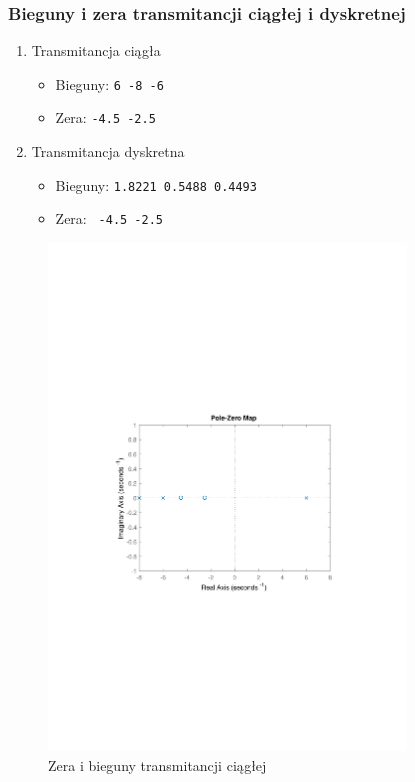 \documentclass{article}
\begin{document}
\subsubsection[Bieguny i zera]{Bieguny i zera transmitancji ciągłej i dyskretnej}
\begin{enumerate}
\item Transmitancja ciągła
\begin{itemize}
\item Bieguny: \verb+6 -8 -6+
\item Zera: \verb+-4.5 -2.5+
\end{itemize}

\item Transmitancja dyskretna
\begin{itemize}
\item Bieguny: \verb+1.8221 0.5488 0.4493+
\item Zera: \verb+ -4.5 -2.5+
\end{itemize}
\end{enumerate}
\begin{figure}[t]
\centering
\includegraphics[clip, trim=3cm 9cm 3cm 9.5cm, width=9.5cm]{../rys/rys1.pdf}
\caption{Zera i bieguny transmitancji ciągłej}
\label{fig:rys 1}
\end{figure}
\end{document}
